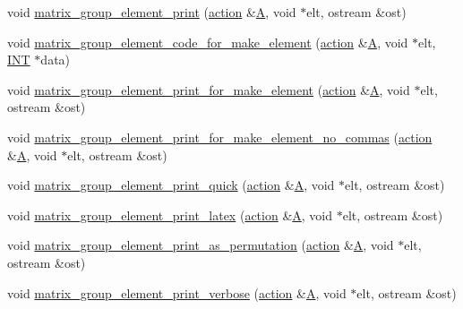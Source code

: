 \begin{DoxyCompactItemize}
\item 
void \mbox{\hyperlink{interface__matrix__group_8_c_a713a62ca79f61e584fa43b4498247cc6}{matrix\+\_\+group\+\_\+element\+\_\+print}} (\mbox{\hyperlink{classaction}{action}} \&\mbox{\hyperlink{simeon_8_c_a97833f04c3a9c008df5521a2fc291bb4}{A}}, void $\ast$elt, ostream \&ost)
\item 
void \mbox{\hyperlink{interface__matrix__group_8_c_ad6f951b50c8813e31f34304c55ccd2d9}{matrix\+\_\+group\+\_\+element\+\_\+code\+\_\+for\+\_\+make\+\_\+element}} (\mbox{\hyperlink{classaction}{action}} \&\mbox{\hyperlink{simeon_8_c_a97833f04c3a9c008df5521a2fc291bb4}{A}}, void $\ast$elt, \mbox{\hyperlink{galois_8h_a09fddde158a3a20bd2dcadb609de11dc}{I\+NT}} $\ast$data)
\item 
void \mbox{\hyperlink{interface__matrix__group_8_c_a6905197218a258e1199528507d8d9d6b}{matrix\+\_\+group\+\_\+element\+\_\+print\+\_\+for\+\_\+make\+\_\+element}} (\mbox{\hyperlink{classaction}{action}} \&\mbox{\hyperlink{simeon_8_c_a97833f04c3a9c008df5521a2fc291bb4}{A}}, void $\ast$elt, ostream \&ost)
\item 
void \mbox{\hyperlink{interface__matrix__group_8_c_a087e39e2b3527200e7d4bd434015f959}{matrix\+\_\+group\+\_\+element\+\_\+print\+\_\+for\+\_\+make\+\_\+element\+\_\+no\+\_\+commas}} (\mbox{\hyperlink{classaction}{action}} \&\mbox{\hyperlink{simeon_8_c_a97833f04c3a9c008df5521a2fc291bb4}{A}}, void $\ast$elt, ostream \&ost)
\item 
void \mbox{\hyperlink{interface__matrix__group_8_c_a856195b883877c6170997dc4b3b321e0}{matrix\+\_\+group\+\_\+element\+\_\+print\+\_\+quick}} (\mbox{\hyperlink{classaction}{action}} \&\mbox{\hyperlink{simeon_8_c_a97833f04c3a9c008df5521a2fc291bb4}{A}}, void $\ast$elt, ostream \&ost)
\item 
void \mbox{\hyperlink{interface__matrix__group_8_c_a5ef3d1dd2589cd1dfffde4e2883df884}{matrix\+\_\+group\+\_\+element\+\_\+print\+\_\+latex}} (\mbox{\hyperlink{classaction}{action}} \&\mbox{\hyperlink{simeon_8_c_a97833f04c3a9c008df5521a2fc291bb4}{A}}, void $\ast$elt, ostream \&ost)
\item 
void \mbox{\hyperlink{interface__matrix__group_8_c_a91ca957e7be142f650a23cba99fb20a7}{matrix\+\_\+group\+\_\+element\+\_\+print\+\_\+as\+\_\+permutation}} (\mbox{\hyperlink{classaction}{action}} \&\mbox{\hyperlink{simeon_8_c_a97833f04c3a9c008df5521a2fc291bb4}{A}}, void $\ast$elt, ostream \&ost)
\item 
void \mbox{\hyperlink{interface__matrix__group_8_c_aa5cc004a0b3beeb862b7ced40db8feb2}{matrix\+\_\+group\+\_\+element\+\_\+print\+\_\+verbose}} (\mbox{\hyperlink{classaction}{action}} \&\mbox{\hyperlink{simeon_8_c_a97833f04c3a9c008df5521a2fc291bb4}{A}}, void $\ast$elt, ostream \&ost)

\end{DoxyCompactItemize}
